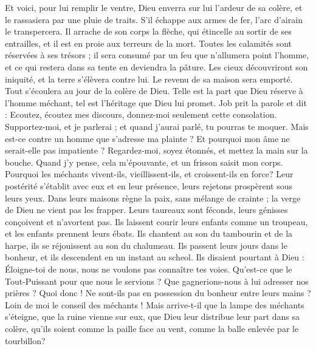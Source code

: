 \begin{multicols}{2}
Et voici, pour lui remplir le ventre, Dieu enverra sur lui l'ardeur de sa colère, et le rassasiera par une pluie de traits.
S'il échappe aux armes de fer, l'arc d'airain le transpercera.
Il arrache de son corps la flèche, qui étincelle au sortir de ses entrailles, et il est en proie aux terreurs de la mort.
Toutes les calamités sont réservées à ses trésors ; il sera consumé par un feu que n'allumera point l'homme, et ce qui restera dans sa tente en deviendra la pâture.
Les cieux découvriront son iniquité, et la terre s'élèvera contre lui.
Le revenu de sa maison sera emporté. Tout s'écoulera au jour de la colère de Dieu.
Telle est la part que Dieu réserve à l'homme méchant, tel est l'héritage que Dieu lui promet.
\VerseOne{}Job prit la parole et dit :
Ecoutez, écoutez mes discours, donnez-moi seulement cette consolation.
Supportez-moi, et je parlerai ; et quand j'aurai parlé, tu pourras te moquer.
Mais est-ce contre un homme que s'adresse ma plainte ? Et pourquoi mon âme ne serait-elle pas impatiente ?
Regardez-moi, soyez étonnés, et mettez la main sur la bouche.
Quand j'y pense, cela m'épouvante, et un frisson saisit mon corps.
Pourquoi les méchants vivent-ils, vieillissent-ils, et croissent-ils en force?
Leur postérité s'établit avec eux et en leur présence, leurs rejetons prospèrent sous leurs yeux.
Dans leurs maisons règne la paix, sans mélange de crainte ; la verge de Dieu ne vient pas les frapper.
Leurs taureaux sont féconds, leurs génisses conçoivent et n'avortent pas.
Ils laissent courir leurs enfants comme un troupeau, et les enfants prennent leurs ébats.
Ils chantent au son du tambourin et de la harpe, ils se réjouissent au son du chalumeau.
Ils passent leurs jours dans le bonheur, et ils descendent en un instant au scheol.
Ils disaient pourtant à Dieu : Éloigne-toi de nous, nous ne voulons pas connaître tes voies.
Qu'est-ce que le Tout-Puissant pour que nous le servions ? Que gagnerions-nous à lui adresser nos prières ?
Quoi donc ! Ne sont-ils pas en possession du bonheur entre leurs mains ? Loin de moi le conseil des méchants !
Mais arrive-t-il que la lampe des méchants s'éteigne, que la ruine vienne sur eux, que Dieu leur distribue leur part dans sa colère,
qu'ils soient comme la paille face au vent, comme la balle enlevée par le tourbillon?

\end{multicols}
